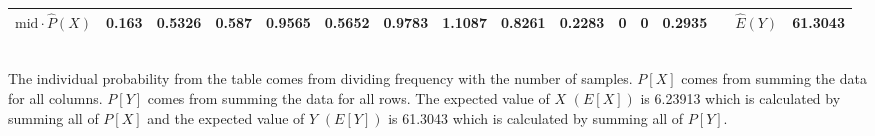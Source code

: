 \begin{table}[ht]
\begin{adjustbox}{width = \textwidth, center}
\begin{tabular}{|cc|r|r|r|r|r|r|r|r|r|r|r|r|r|r|r|}
            \multicolumn{2}{|c|}{\cellcolor[HTML]{FCE5CD}$\mathrm{mid}\cdot\widehat{P}(X)$} & \cellcolor[HTML]{FCE5CD}0.163                  & \cellcolor[HTML]{FCE5CD}0.5326                 & \cellcolor[HTML]{FCE5CD}0.587                  & \cellcolor[HTML]{FCE5CD}0.9565                 & \cellcolor[HTML]{FCE5CD}0.5652                 & \cellcolor[HTML]{FCE5CD}0.9783                 & \cellcolor[HTML]{FCE5CD}1.1087                 & \cellcolor[HTML]{FCE5CD}0.8261                  & \cellcolor[HTML]{FCE5CD}0.2283                  & \cellcolor[HTML]{FCE5CD}0                       & \cellcolor[HTML]{FCE5CD}0                       & \cellcolor[HTML]{FCE5CD}0.2935                  & \multicolumn{1}{l|}{}                                                           & \multicolumn{1}{c|}{\cellcolor[HTML]{C9DAF8}$\widehat{E}(Y)$}           & \cellcolor[HTML]{C9DAF8}61.3043                                                                  \\ \hline
        \end{tabular}
    \end{adjustbox}
\end{table}\\
\noindent The individual probability from the table comes from dividing frequency with the number of samples. $P[X]$ comes from summing the data for all columns. $P[Y]$ comes from summing the data for all rows. The expected value of $X$ $(E[X])$ is 6.23913 which is calculated by summing all of $P[X]$ and the expected value of $Y$ $(E[Y])$ is 61.3043 which is calculated by summing all of $P[Y]$.\\
